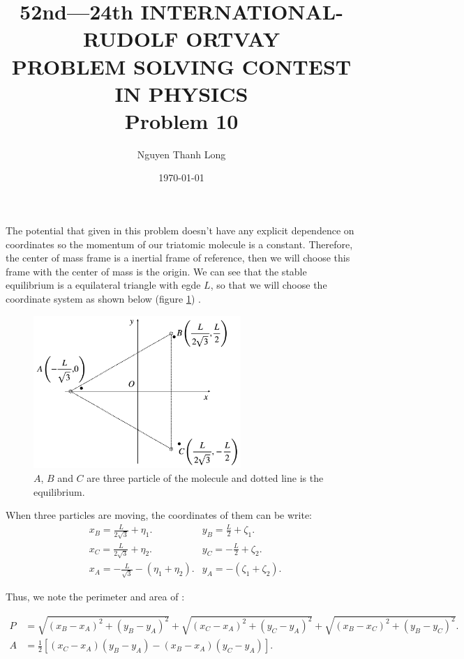 \documentclass[12pt]{article}
\title{52nd—24th INTERNATIONAL-RUDOLF ORTVAY \\ PROBLEM SOLVING CONTEST IN PHYSICS \\ Problem 10}
\author{Nguyen Thanh Long}
\date{\today}
\begin{document}
	
\maketitle
	
\noindent The potential that given in this problem doesn't have any explicit dependence on coordinates so the momentum of our triatomic molecule is a constant. Therefore, the center of mass frame is a inertial frame of reference, then we will choose this frame with the center of mass is the origin. We can see that the stable equilibrium is a equilateral triangle with egde $L$, so that we will choose the coordinate system as shown below (figure \ref{fig1}) .

\begin{figure}[!htb]
	\centering
	\includegraphics[width=0.7\textwidth]{Fig P10.png}
	\caption{$A$, $B$ and $C$ are three particle of the molecule and dotted line is the equilibrium.}
	\label{fig1}
\end{figure}

\noindent When three particles are moving, the coordinates of them can be write:
\begin{align*}
	& x_B = \frac{L}{2\sqrt{3}}+ \eta_1 .
	& y_B = \frac{L}{2} + \zeta_1 . \\	
	& x_C = \frac{L}{2\sqrt{3}} + \eta_2 .
	& y_C = - \frac{L}{2} + \zeta_2 .\\
	& x_A = - \frac{L}{\sqrt{3}} - \left( \eta_1 + \eta_2 \right) .
	& y_A = - \left( \zeta_1 + \zeta_2 \right) .
\end{align*}	

\noindent Thus, we note the perimeter and area of : 

\begin{align*}
	P & = \sqrt{ \left( x_B - x_A \right)^2 + \left( y_B - y_A \right)^2 } + \sqrt{ \left( x_C - x_A \right)^2 + \left( y_C - y_A \right)^2 } + \sqrt{ \left( x_B - x_C \right)^2 + \left( y_B - y_C \right)^2 } . \\
	A & = \frac{1}{2} \left[ \left( x_C - x_A \right) \left( y_B - y_A \right) - \left( x_B - x_A \right) \left( y_C - y_A \right) \right].	
\end{align*}	
\end{document}
